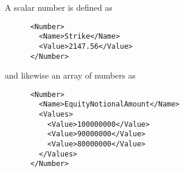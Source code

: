 A scalar number is defined as

\begin{verbatim}
      <Number>
        <Name>Strike</Name>
        <Value>2147.56</Value>
      </Number>
\end{verbatim}

and likewise an array of numbers as

\begin{verbatim}
      <Number>
        <Name>EquityNotionalAmount</Name>
        <Values>
          <Value>100000000</Value>
          <Value>90000000</Value>
          <Value>80000000</Value>
        </Values>
      </Number>
\end{verbatim}
